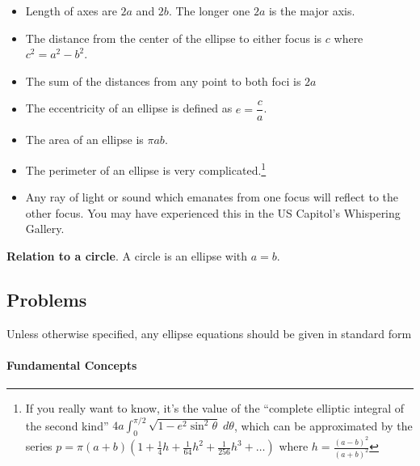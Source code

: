 \documentclass[11pt]{article}
\begin{document}
\begin{itemize}

\item
  Length of axes are \(2a\) and \(2b\). The longer one $2a$ is the major
  axis.
\item
  The distance from the center of the ellipse to either focus is \(c\)
  where \(c^2 = a^2-b^2\).
\item
  The sum of the distances from any point to both foci is
  \(2a\)
\item
  The eccentricity of an ellipse is defined as \(e = \dfrac{c}{a}\).
\item
  The area of an ellipse is \(\pi a b\).
\item
  The perimeter of an ellipse is very complicated.\footnote{If you really
    want to know, it's the value of the ``complete elliptic integral of
    the second kind''
    \(4a \int_0^{\pi/2} \sqrt{1 - e^2 \sin^2 \theta} \; d\theta\), which
    can be approximated by the series
    \(p = \pi(a+b)\left(1 + \frac14 h + \frac{1}{64}h^2 + \frac{1}{256}h^3 + \ldots\right)\)
    where \(h = \frac{(a-b)^2}{(a+b)^2}\)}
\item
  Any ray of light or sound which emanates from one focus will reflect
  to the other focus. You may have experienced this in the US Capitol's
  Whispering Gallery.
\end{itemize}

\textbf{Relation to a circle}. A circle is an ellipse with \(a=b\).

\hypertarget{problems}{%
\subsection{Problems}\label{problems}}

Unless otherwise specified, any ellipse equations should be given in
standard form

\hypertarget{fundamental-concepts}{%
\paragraph{Fundamental Concepts}\label{fundamental-concepts}}
\end{document}
